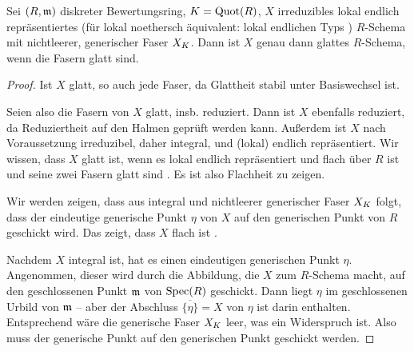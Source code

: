 \documentclass[german]{scrreprt}
\begin{document}
\begin{Lemma}\label{thm:glattüberdvr}
  Sei $(R,\mathfrak{m})$ diskreter Bewertungsring, $K=\operatorname{Quot}(R)$, $X$
  irreduzibles
  lokal endlich repräsentiertes
  (für lokal noethersch äquivalent:
  lokal endlichen Typs \cite[Remark 10.36]{wedhorn})
  $R$-Schema mit nichtleerer, generischer Faser $X_{K}$.
  Dann ist $X$ genau dann glattes $R$-Schema, wenn die Fasern glatt
  sind.
  \begin{proof}
    Ist $X$ glatt, so auch jede Faser, da Glattheit stabil unter
    Basiswechsel ist.

    Seien also die Fasern von $X$ glatt, insb. reduziert.
    Dann ist $X$ ebenfalls reduziert, da Reduziertheit auf den Halmen
    geprüft werden kann.
    Außerdem ist $X$ nach Voraussetzung irreduzibel, daher integral,
    und (lokal) endlich repräsentiert.
    Wir wissen, dass $X$ glatt ist, wenn es lokal endlich repräsentiert
    und flach über $R$ ist und seine zwei Fasern glatt sind
    \cite[8.5, Proposition 17]{bosch}.
    Es ist also Flachheit zu zeigen.
    
    Wir werden zeigen, dass aus integral und nichtleerer generischer
    Faser $X_{K}$ folgt, dass der eindeutige generische Punkt $\eta$
    von $X$ auf den generischen Punkt von $R$ geschickt wird.
    Das zeigt, dass $X$ flach ist \cite[Proposition III.9.7]{hartshorne}.

    Nachdem $X$ integral ist, hat es einen eindeutigen generischen
    Punkt $\eta$.
    Angenommen, dieser wird durch die Abbildung, die $X$ zum
    $R$-Schema macht, auf den geschlossenen Punkt $\mathfrak{m}$ von $\operatorname{Spec}(R)$
    geschickt.
    Dann liegt $\eta$ im geschlossenen Urbild von $\mathfrak{m}$ –
    aber der Abschluss $\overline{\{\eta\}}=X$ von $\eta$ ist darin
    enthalten. Entsprechend wäre die generische Faser $X_{K}$
    leer, was ein Widerspruch ist.
    Also muss der generische Punkt auf den generischen Punkt geschickt
    werden.
  \end{proof}
\end{Lemma}
\end{document}
